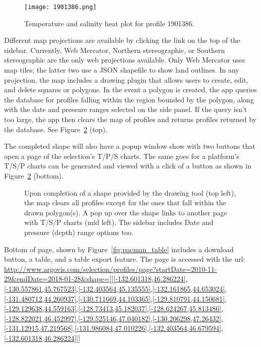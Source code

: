 \begin{figure}[ht]
\centering
\begin{minipage}{6in}
\texttt{[image: 1901386.png]}
\caption{\label{fig:platform_data}Temperature and salinity heat plot for profile 1901386.}
\end{minipage}
\end{figure}

Different map projections are available by clicking the link on the top of the sidebar. Currently, Web Mercator, Northern stereographic, or Southern stereographic are the only web projections available. Only Web Mercator uses map tiles; the latter two use a JSON shapefile to show land outlines. In any projection, the map includes a drawing plugin that allows users to create, edit, and delete squares or polygons. In the event a polygon is created, the app queries the database for profiles falling within the region bounded by the polygon, along with the date and pressure ranges selected on the side panel. If the query isn't too large, the app then clears the map of profiles and returns profiles returned by the database. See Figure~\ref{fig:heart_sel} (top).

The completed shape will also have a popup window show with two buttons that open a page of the selection's T/P/S charts. The same goes for a platform's T/S/P charts can be generated and viewed with a click of a button as shown in Figure~\ref{fig:heart_sel} (bottom).

\begin{figure}[H]
\caption{\label{fig:heart_sel} Upon completion of a shape provided by the drawing tool (top left), the map clears all profiles except for the ones that fall within the drawn polygon(s). A pop up over the shape links to another page with T/S/P charts (mid left). The sidebar includes Date and pressure (depth) range options too.}
\end{figure}

Bottom of page, shown by Figure~\ref{fig:pacman_table} includes a download button, a table, and a table export feature. The page is accessed with the url: \url{http://www.argovis.com/selection/profiles/page?startDate=2010-11-29&endDate=2018-01-28&shape=[[[-132.601318,46.286224],[-130.557861,45.767523],[-132.403564,45.135555],[-132.161865,44.653024],[-131.480712,44.260937],[-130.711669,44.103365],[-129.810791,44.150681],[-129.129638,44.559163],[-128.73413,45.182037],[-128.624267,45.813486],[-128.822021,46.452997],[-129.525146,47.040182],[-130.206298,47.26432],[-131.12915,47.219568],[-131.986084,47.010226],[-132.403564,46.679594],[-132.601318,46.286224]]]}


